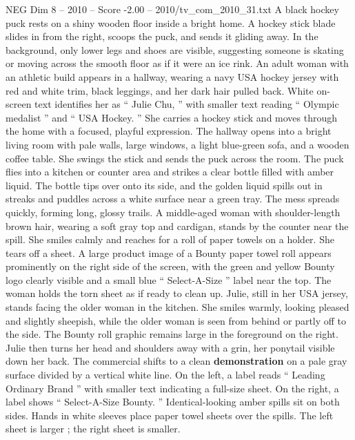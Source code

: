 \begin{textsample}{NEG Dim 8 – 2010 – Score -2.00 – 2010/tv\_com\_2010\_31.txt}  \label{ex:f8_neg_078}
A black hockey puck rests on a shiny wooden floor inside a bright home.
A hockey stick blade slides in from the right, scoops the puck, and sends it gliding away.
In the background, only lower legs and shoes are visible, suggesting someone is skating or moving across the smooth floor as if it were an ice rink.
An adult woman with an athletic build appears in a hallway, wearing a navy USA hockey jersey with red and white trim, black leggings, and her dark hair pulled back.
White on-screen text identifies her as “ Julie Chu, ” with smaller text reading “ Olympic medalist ” and “ USA Hockey. ” She carries a hockey stick and moves through the home with a focused, playful expression.
The hallway opens into a bright living room with pale walls, large windows, a light blue-green sofa, and a wooden coffee table.
She swings the stick and sends the puck across the room.
The puck flies into a kitchen or counter area and strikes a clear bottle filled with amber liquid.
The bottle tips over onto its side, and the golden liquid spills out in streaks and puddles across a white surface near a green tray.
The mess spreads quickly, forming long, glossy trails.
A middle-aged woman with shoulder-length brown hair, wearing a soft gray top and cardigan, stands by the counter near the spill.
She smiles calmly and reaches for a roll of paper towels on a holder.
She tears off a sheet.
A large product image of a Bounty paper towel roll appears prominently on the right side of the screen, with the green and yellow Bounty logo clearly visible and a small blue “ Select-A-Size ” label near the top.
The woman holds the torn sheet as if ready to clean up.
Julie, still in her USA jersey, stands facing the older woman in the kitchen.
She smiles warmly, looking pleased and slightly sheepish, while the older woman is seen from behind or partly off to the side.
The Bounty roll graphic remains large in the foreground on the right.
Julie then turns her head and shoulders away with a grin, her ponytail visible down her back.
The commercial shifts to a clean \textbf{demonstration} on a pale gray surface divided by a vertical white line.
On the left, a label reads “ Leading Ordinary Brand ” with smaller text indicating a full-size sheet.
On the right, a label shows “ Select-A-Size Bounty. ” Identical-looking amber spills sit on both sides.
Hands in white sleeves place paper towel sheets over the spills.
The left sheet is larger ; the right sheet is smaller.

\end{textsample}
